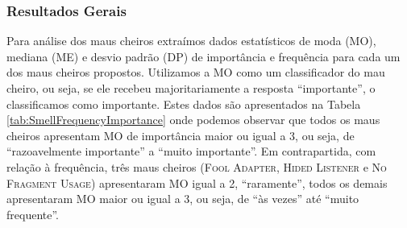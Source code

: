
\subsubsection{Resultados Gerais}
\label{phase2-general-results}

Para análise dos maus cheiros extraímos dados estatísticos de moda (MO), mediana (ME) e desvio padrão (DP) de importância e frequência para cada um dos maus cheiros propostos. Utilizamos a MO como um classificador do mau cheiro, ou seja, se ele recebeu majoritariamente a resposta ``importante'', o classificamos como importante. Estes dados são apresentados na Tabela \ref{tab:SmellFrequencyImportance} onde podemos observar que todos os maus cheiros apresentam MO de importância maior ou igual a 3, ou seja, de ``razoavelmente importante'' a ``muito importante''. Em contrapartida, com relação à frequência, três maus cheiros (\textsc{\small Fool Adapter}, \textsc{\small Hided Listener} e \textsc{\small No Fragment Usage}) apresentaram MO igual a 2, ``raramente'', todos os demais apresentaram MO maior ou igual a 3, ou seja, de ``às vezes'' até ``muito frequente''.

